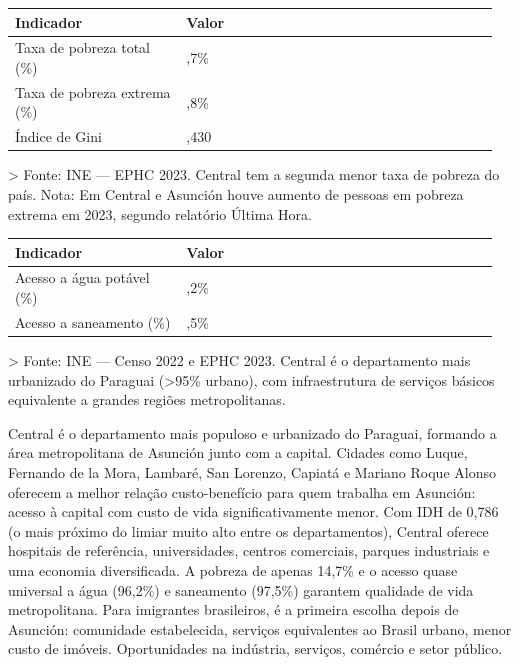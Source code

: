 {\small
\setlength{\tabcolsep}{3pt}
\renewcommand{\arraystretch}{1.12}
\begin{tabularx}{\linewidth}{>{\raggedright\arraybackslash}p{0.34\linewidth} >{\raggedright\arraybackslash}p{0.62\linewidth}}
\toprule
Indicador & Valor \\
\midrule
Taxa de pobreza total (\%) & 14,7\% \\
Taxa de pobreza extrema (\%) & 2,8\% \\
Índice de Gini & 0,430 \\
\bottomrule
\end{tabularx}
}

> Fonte: INE --- EPHC 2023. Central tem a segunda menor taxa de pobreza do país. Nota: Em Central e Asunción houve aumento de pessoas em pobreza extrema em 2023, segundo relatório Última Hora.


{\small
\setlength{\tabcolsep}{3pt}
\renewcommand{\arraystretch}{1.12}
\begin{tabularx}{\linewidth}{>{\raggedright\arraybackslash}p{0.34\linewidth} >{\raggedright\arraybackslash}p{0.62\linewidth}}
\toprule
Indicador & Valor \\
\midrule
Acesso a água potável (\%) & 96,2\% \\
Acesso a saneamento (\%) & 97,5\% \\
\bottomrule
\end{tabularx}
}

> Fonte: INE --- Censo 2022 e EPHC 2023. Central é o departamento mais urbanizado do Paraguai (>95\% urbano), com infraestrutura de serviços básicos equivalente a grandes regiões metropolitanas.


Central é o departamento mais populoso e urbanizado do Paraguai, formando a área metropolitana de Asunción junto com a capital. Cidades como Luque, Fernando de la Mora, Lambaré, San Lorenzo, Capiatá e Mariano Roque Alonso oferecem a melhor relação custo-benefício para quem trabalha em Asunción: acesso à capital com custo de vida significativamente menor. Com IDH de 0,786 (o mais próximo do limiar muito alto entre os departamentos), Central oferece hospitais de referência, universidades, centros comerciais, parques industriais e uma economia diversificada. A pobreza de apenas 14,7\% e o acesso quase universal a água (96,2\%) e saneamento (97,5\%) garantem qualidade de vida metropolitana. Para imigrantes brasileiros, é a primeira escolha depois de Asunción: comunidade estabelecida, serviços equivalentes ao Brasil urbano, menor custo de imóveis. Oportunidades na indústria, serviços, comércio e setor público.


